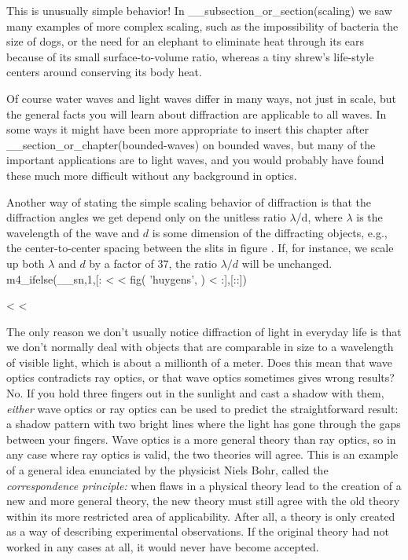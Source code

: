This is unusually simple behavior! In __subsection_or_section(scaling)
we saw many examples of more complex scaling, such as
the impossibility of bacteria the size of dogs, or the need
for an elephant to eliminate heat through its ears because
of its small surface-to-volume ratio, whereas a tiny shrew's
life-style centers around conserving its body heat.

Of course water waves and light waves differ in many ways,
not just in scale, but the general facts you will learn
about diffraction are applicable to all waves. In some ways
it might have been more appropriate to insert this chapter
after __section_or_chapter(bounded-waves) on bounded waves, but many of the
important applications are to light waves, and you would
probably have found these much more difficult without any
background in optics.

Another way of stating the simple scaling behavior of
diffraction is that the diffraction angles we get depend
only on the unitless ratio $\lambda $/d, where $\lambda$ is
the wavelength of the wave and $d$ is some dimension of the
diffracting objects, e.g., the center-to-center spacing
between the slits in figure . If, for instance, we scale
up both $\lambda $ and $d$ by a factor of 37, the ratio
$\lambda /d$ will be unchanged.
m4_ifelse(__sn,1,[:
<%
<%
  fig(
    'huygens',
  )
<%
:],[::])

<%
<%

The only reason we don't usually notice diffraction of light
in everyday life is that we don't normally deal with objects
that are comparable in size to a wavelength of visible
light, which is about a millionth of a meter. Does this mean
that wave optics contradicts ray optics, or that wave optics
sometimes gives wrong results? No. If you hold three fingers
out in the sunlight and cast a shadow with them, \emph{either}
wave optics or ray optics can be used to predict the
straightforward result: a shadow pattern with two bright
lines where the light has gone through the gaps between your
fingers. Wave optics is a more general theory than ray
optics, so in any case where ray optics is valid, the two
theories will agree. This is an example of a general idea
enunciated by the physicist Niels Bohr,
called the \emph{correspondence
principle:\/} when flaws in a physical theory lead to the
creation of a new and more general theory, the new theory
must still agree with the old theory within its more
restricted area of applicability. After all, a theory is
only created as a way of describing experimental observations.
If the original theory had not worked in any cases at all,
it would never have become accepted.

